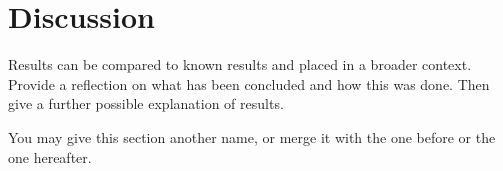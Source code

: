 \section{Discussion}
Results can be compared to known results and placed in a broader context.
Provide a reflection on what has been concluded and how this was done.
Then give a further possible explanation of results.

You may give this section another name, or merge it with the one before or the one hereafter.